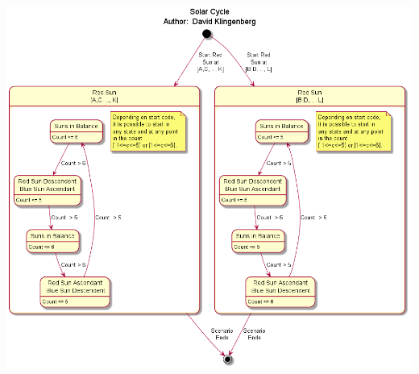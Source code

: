 \documentclass[12pt,a4paper,titlepage]{article}
\begin{document}
\begin{center}
\includegraphics[width=\linewidth]{SolarCycle.png}
\end{center}
\pagebreak
\end{document}
